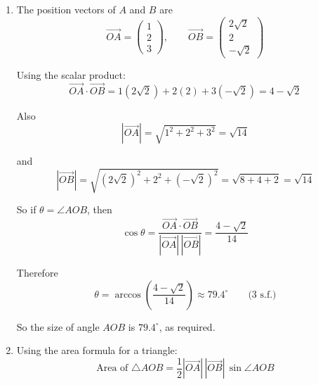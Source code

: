 \documentclass[leqno]{article}
\begin{document}
\begin{enumerate}[
  label=\textbf{\arabic*.},
  leftmargin=*,
  topsep=0pt,
  partopsep=0pt,
  parsep=0pt
]
\begin{djsSolution}
\begin{enumerate}[label=\textbf{(\alph*)}]
Then apply \(\mathbf N\):
\begin{align*}
\mathbf N(\mathbf M\mathbf a)
&=
\begin{pmatrix}
-1&0&0\\
0&1&0\\
0&0&1
\end{pmatrix}
\begin{pmatrix}
-2\sqrt2\\
2\\
-\sqrt2
\end{pmatrix} \\
&=
\begin{pmatrix}
2\sqrt2\\
2\\
-\sqrt2
\end{pmatrix}
\end{align*}

Hence the coordinates of \(B\) are
\[
(2\sqrt2,\,2,\,-\sqrt2)
\]

\item The position vectors of \(A\) and \(B\) are
\[
\overrightarrow{OA}=\begin{pmatrix}1\\2\\3\end{pmatrix},
\qquad
\overrightarrow{OB}=\begin{pmatrix}2\sqrt2\\2\\-\sqrt2\end{pmatrix}
\]

Using the scalar product:
\[
\overrightarrow{OA}\cdot\overrightarrow{OB}
=1(2\sqrt2)+2(2)+3(-\sqrt2)
=4-\sqrt2
\]

Also
\[
|\overrightarrow{OA}|=\sqrt{1^2+2^2+3^2}=\sqrt{14}
\]

and
\[
|\overrightarrow{OB}|=\sqrt{(2\sqrt2)^2+2^2+(-\sqrt2)^2}
=\sqrt{8+4+2}
=\sqrt{14}
\]

So if \(\theta=\angle AOB\), then
\[
\cos\theta
=\frac{\overrightarrow{OA}\cdot\overrightarrow{OB}}
{|\overrightarrow{OA}|\,|\overrightarrow{OB}|}
=\frac{4-\sqrt2}{14}
\]

Therefore
\[
\theta=\arccos\left(\frac{4-\sqrt2}{14}\right)\approx 79.4^\circ\qquad\text{(3 s.f.)}
\]

So the size of angle \(AOB\) is \(79.4^\circ\), as required.

\item Using the area formula for a triangle:
\[
\text{Area of } \triangle AOB
=\frac12 |\overrightarrow{OA}|\,|\overrightarrow{OB}|\,\sin\angle AOB
\]


\end{enumerate}
\end{djsSolution}
\end{enumerate}
\end{document}
